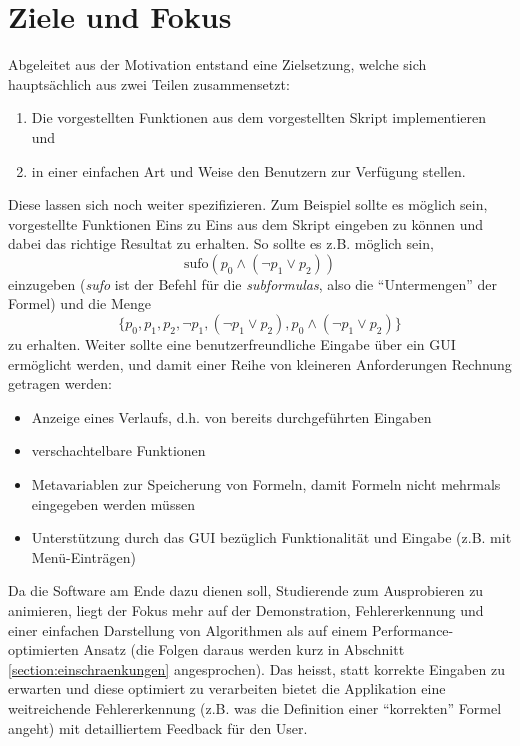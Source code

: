 \documentclass[11pt,a4paper,ngerman]{scrreprt}
\begin{document}
\section{Ziele und Fokus}
Abgeleitet aus der Motivation entstand eine Zielsetzung, welche sich hauptsächlich aus zwei Teilen zusammensetzt:
\begin{enumerate}
 \item Die vorgestellten Funktionen aus dem vorgestellten Skript implementieren und
 \item in einer einfachen Art und Weise den Benutzern zur Verfügung stellen.
\end{enumerate}
Diese lassen sich noch weiter spezifizieren. Zum Beispiel sollte es möglich sein, vorgestellte Funktionen Eins zu Eins aus dem Skript eingeben zu können und dabei das richtige Resultat zu erhalten. So sollte es z.B. möglich sein, 
\begin{equation}
\text{sufo} (p_0 \wedge (\neg p_1 \vee p_2))
\end{equation}
einzugeben (\textit{sufo} ist der Befehl für die \textit{subformulas}, also die ``Untermengen'' der Formel) und die Menge 
\begin{equation}
\{ p_0, p_1, p_2, \neg p_1, (\neg p_1 \vee p_2), p_0 \wedge (\neg p_1 \vee p_2) \}
\end{equation}
zu erhalten. Weiter sollte eine benutzerfreundliche Eingabe über ein GUI ermöglicht werden, und damit einer Reihe von kleineren Anforderungen Rechnung getragen werden:
\begin{itemize}
 \item Anzeige eines Verlaufs, d.h. von bereits durchgeführten Eingaben
 \item verschachtelbare Funktionen
 \item Metavariablen zur Speicherung von Formeln, damit Formeln nicht mehrmals eingegeben werden müssen
 \item Unterstützung durch das GUI bezüglich Funktionalität und Eingabe (z.B. mit Menü-Einträgen)
\end{itemize}
Da die Software am Ende dazu dienen soll, Studierende zum Ausprobieren zu animieren, liegt der Fokus mehr auf der Demonstration, Fehlererkennung und einer einfachen Darstellung von Algorithmen als auf einem Performance-optimierten Ansatz (die Folgen daraus werden kurz in Abschnitt \ref{section:einschraenkungen} angesprochen). Das heisst, statt korrekte Eingaben zu erwarten und diese optimiert zu verarbeiten bietet die Applikation eine weitreichende Fehlererkennung (z.B. was die Definition einer ``korrekten'' Formel angeht) mit detailliertem Feedback für den User. 
\end{document}
